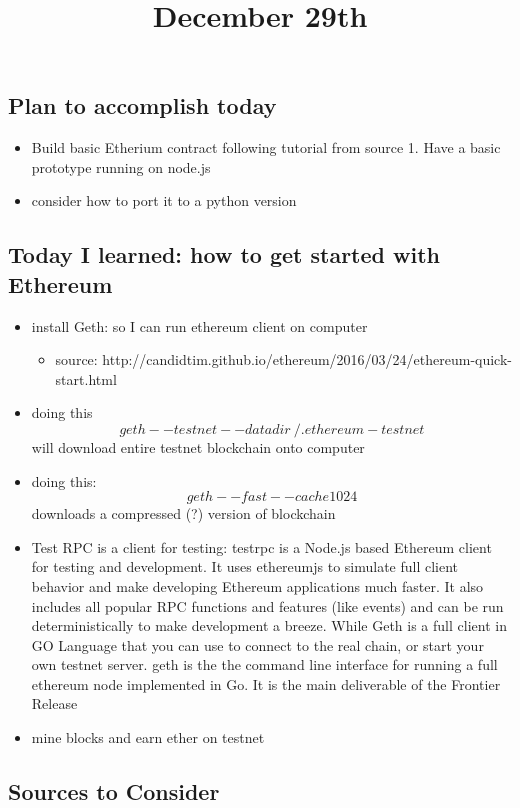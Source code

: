 \title{December 29th}

\subsection{Plan to accomplish today}

\begin{itemize}
	\item Build basic Etherium contract following tutorial from source 1. Have a basic prototype running on node.js
	\item consider how to port it to a python version
\end{itemize}

\subsection{Today I learned: how to get started with Ethereum}


\begin{itemize}
	\item install Geth: so I can run ethereum client on computer
		\begin{itemize}	
			\item source: http://candidtim.github.io/ethereum/2016/03/24/ethereum-quick-start.html
		\end{itemize}
	\item doing this \[geth --testnet --datadir ~/.ethereum-testnet\] will download entire testnet blockchain onto computer
	\item doing this: \[geth --fast --cache 1024\] downloads a compressed (?) version of blockchain
	\item Test RPC is a client for testing:
			testrpc is a Node.js based Ethereum client for testing and development. It uses ethereumjs to simulate full client behavior and make developing Ethereum applications much faster. It also includes all popular RPC functions and features (like events) and can be run deterministically to make development a breeze.
			While Geth is a full client in GO Language that you can use to connect to the real chain, or start your own testnet server.
			geth is the the command line interface for running a full ethereum node implemented in Go. It is the main deliverable of the Frontier Release
	\item mine blocks and earn ether on testnet
\end{itemize}


\subsection{Sources to Consider}

